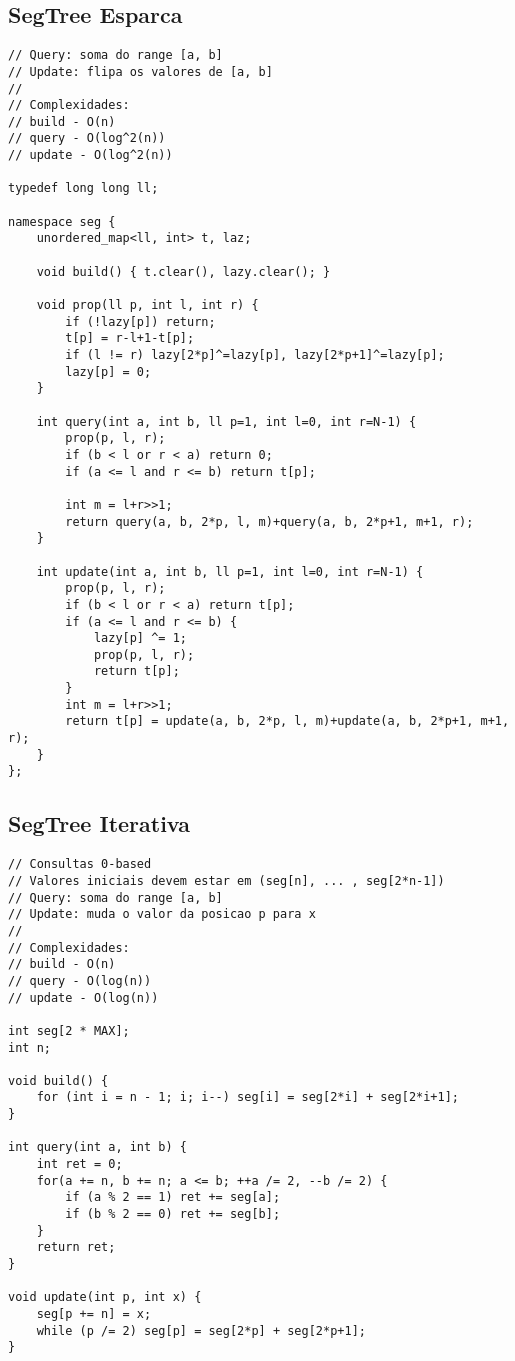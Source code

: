 \documentclass[12pt, a4paper, twoside]{article}
\begin{document}
\subsection{SegTree Esparca}
\begin{lstlisting}
// Query: soma do range [a, b]
// Update: flipa os valores de [a, b]
//
// Complexidades:
// build - O(n)
// query - O(log^2(n))
// update - O(log^2(n))

typedef long long ll;

namespace seg {
	unordered_map<ll, int> t, laz;

	void build() { t.clear(), lazy.clear(); }

	void prop(ll p, int l, int r) {
		if (!lazy[p]) return;
		t[p] = r-l+1-t[p];
		if (l != r) lazy[2*p]^=lazy[p], lazy[2*p+1]^=lazy[p];
		lazy[p] = 0;
	}

	int query(int a, int b, ll p=1, int l=0, int r=N-1) {
		prop(p, l, r);
		if (b < l or r < a) return 0;
		if (a <= l and r <= b) return t[p];

		int m = l+r>>1;
		return query(a, b, 2*p, l, m)+query(a, b, 2*p+1, m+1, r);
	}

	int update(int a, int b, ll p=1, int l=0, int r=N-1) {
		prop(p, l, r);
		if (b < l or r < a) return t[p];
		if (a <= l and r <= b) {
			lazy[p] ^= 1;
			prop(p, l, r);
			return t[p];
		}
		int m = l+r>>1;
		return t[p] = update(a, b, 2*p, l, m)+update(a, b, 2*p+1, m+1, r);
	}
};
\end{lstlisting}

\subsection{SegTree Iterativa}
\begin{lstlisting}
// Consultas 0-based
// Valores iniciais devem estar em (seg[n], ... , seg[2*n-1])
// Query: soma do range [a, b]
// Update: muda o valor da posicao p para x
//
// Complexidades:
// build - O(n)
// query - O(log(n))
// update - O(log(n))

int seg[2 * MAX];
int n;

void build() {
	for (int i = n - 1; i; i--) seg[i] = seg[2*i] + seg[2*i+1];
}

int query(int a, int b) {
	int ret = 0;
	for(a += n, b += n; a <= b; ++a /= 2, --b /= 2) {
		if (a % 2 == 1) ret += seg[a];
		if (b % 2 == 0) ret += seg[b];
	}
	return ret;
}

void update(int p, int x) {
	seg[p += n] = x;
	while (p /= 2) seg[p] = seg[2*p] + seg[2*p+1];
}
\end{lstlisting}
\end{document}
